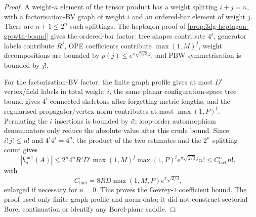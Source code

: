 \begin{proof}
A weight-\(n\) element of the tensor product has a weight splitting
\(i+j=n\), with a factorisation-BV graph of weight \(i\) and an
ordered-bar element of weight \(j\). There are \(n+1\le2^n\) such
splittings.  The heptagon proof of
\autoref{prop:3dg-heptagon-growth-bound} gives the ordered-bar factor:
tree shapes contribute \(4^j\), generator labels contribute \(R^j\),
OPE coefficients contribute \(\max(1,M)^j\), weight decompositions are
bounded by \(p(j)\le e^{\pi\sqrt{2/3}\,j}\), and PBW symmetrisation is
bounded by \(j!\).

For the factorisation-BV factor, the finite graph profile gives at most
\(D^i\) vertex/field labels in total weight \(i\), the same planar
configuration-space tree bound gives \(4^i\) connected skeletons after
forgetting metric lengths, and the regularised propagator/vertex norm
contributes at most \(\max(1,P)^i\).  Permuting the \(i\) insertions is
bounded by \(i!\); loop-order automorphism denominators only reduce the
absolute value after this crude bound. Since \(i!\,j!\le n!\) and
\(4^i4^j=4^n\), the product of the two estimates and the \(2^n\)
splitting count gives
\[
|b_n^{\mathrm{fact}}(A)|
\le
2^n4^nR^jD^i\max(1,M)^j\max(1,P)^i
e^{\pi\sqrt{2/3}\,j}n!
\le
C_{\mathrm{fact}}^n n!,
\]
with
\[
C_{\mathrm{fact}}=8RD\max(1,M,P)e^{\pi\sqrt{2/3}},
\]
enlarged if necessary for \(n=0\). This proves the Gevrey-\(1\)
coefficient bound. The proof used only finite graph-profile and norm
data; it did not construct sectorial Borel continuation or identify any
Borel-plane saddle.
\end{proof}

